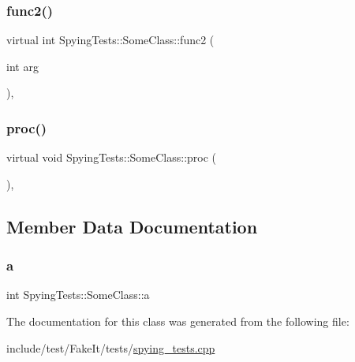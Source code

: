 \mbox{\label{classSpyingTests_1_1SomeClass_ae6d1bd007e56c7c54e0b95dfa8a9621e}} 
\subsubsection{\texorpdfstring{func2()}{func2()}}
{\footnotesize\ttfamily virtual int Spying\+Tests\+::\+Some\+Class\+::func2 (\begin{DoxyParamCaption}\item[{int}]{arg }\end{DoxyParamCaption})\hspace{0.3cm}{\ttfamily [inline]}, {\ttfamily [virtual]}}

\mbox{\label{classSpyingTests_1_1SomeClass_a434e519d6f77c5ee8db5dd9f71da9b8d}} 
\subsubsection{\texorpdfstring{proc()}{proc()}}
{\footnotesize\ttfamily virtual void Spying\+Tests\+::\+Some\+Class\+::proc (\begin{DoxyParamCaption}{ }\end{DoxyParamCaption})\hspace{0.3cm}{\ttfamily [inline]}, {\ttfamily [virtual]}}



\subsection{Member Data Documentation}
\mbox{\label{classSpyingTests_1_1SomeClass_a08f9d9f44b0f8a20f669b650806972c3}} 
\subsubsection{\texorpdfstring{a}{a}}
{\footnotesize\ttfamily int Spying\+Tests\+::\+Some\+Class\+::a}



The documentation for this class was generated from the following file\+:\begin{DoxyCompactItemize}
\item 
include/test/\+Fake\+It/tests/\mbox{\hyperlink{spying__tests_8cpp}{spying\+\_\+tests.\+cpp}}\end{DoxyCompactItemize}
